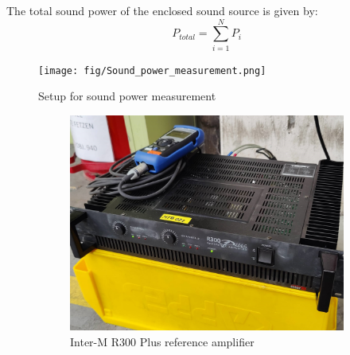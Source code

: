 The total sound power of the enclosed sound source is given by:
\begin{equation}
    P_{total} = \sum_{i = 1}^{N} P_i
\end{equation}

\begin{figure}[H]
\begin{center}
\texttt{[image: fig/Sound\_power\_measurement.png]}
\caption{Setup for sound power measurement}
\label{fig:soundpowersetup}
\end{center}
\end{figure}

\begin{figure}[H]
     \centering
     \begin{subfigure}[b]{0.5\textwidth}
         \centering
         \includegraphics[width=\textwidth]{fig/amplifier_and_signal_generator.jpg}
         \caption{Inter-M R300 Plus reference amplifier}
     \end{subfigure}
     \hspace{0.1\textwidth}
     \begin{subfigure}[b]{0.3\textwidth}
         \centering

\end{subfigure}
\end{figure}
